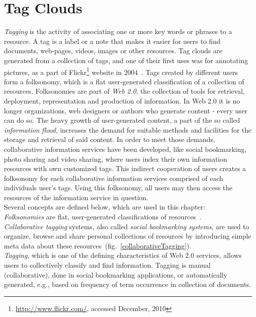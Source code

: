 \chapter{Tag Clouds}
\label{sec:tagclouds}

\textit{Tagging} is the activity of associating one or more key words or phrases to a resource. A tag is a label or a note that makes it easier for users to find documents, web-pages, videos, images or other resources. Tag clouds are generated from a collection of tags, and one of their first uses was for annotating pictures, as a part of Flickr\footnote{\url{http://www.flickr.com/}, accessed December, 2010} website in 2004~\cite{folksonomiesWeb2.0_2009}. Tags created by different users form a folksonomy, which is a flat user-generated classification of a collection of resources. Folksonomies are part of \textit{Web 2.0}, the collection of tools for retrieval, deployment, representation and production of information. In Web 2.0 it is no longer organizations, web designers or authors who generate content - every user can do so. The heavy growth of user-generated content, a part of the so called \textit{information flood}, increases the demand for suitable methods and facilities for the storage and retrieval of said content. In order to meet those demands, collaborative information services have been developed, like social bookmarking, photo sharing and video sharing, where users index their own information resources with own customized tags. This indirect cooperation of users creates a folksonomy for each collaborative information services comprised of each individuals user's tags. Using this folksonomy, all users may then access the resources of the information service in question. \\ 

Several concepts are defined below, which are used in this chapter:\\

\textit{Folksonomies} are flat, user-generated classifications of resources~\cite{folksonomiesWeb2.0_2009}. \\

\textit{Collaborative tagging} systems, also called \textit{social bookmarking systems}, are used to organize, browse and share personal collections of resources by introducing simple meta data about these resources~(fig.~\ref{collaborativeTagging}). \\

\textit{Tagging}, which is one of the defining characteristics of Web 2.0 services, allows users to collectively classify and find information. Tagging is manual (collaborative), done in social bookmarking applications, or automatically generated, e.g., based on frequency of term occurrence in collection of documents.\\

